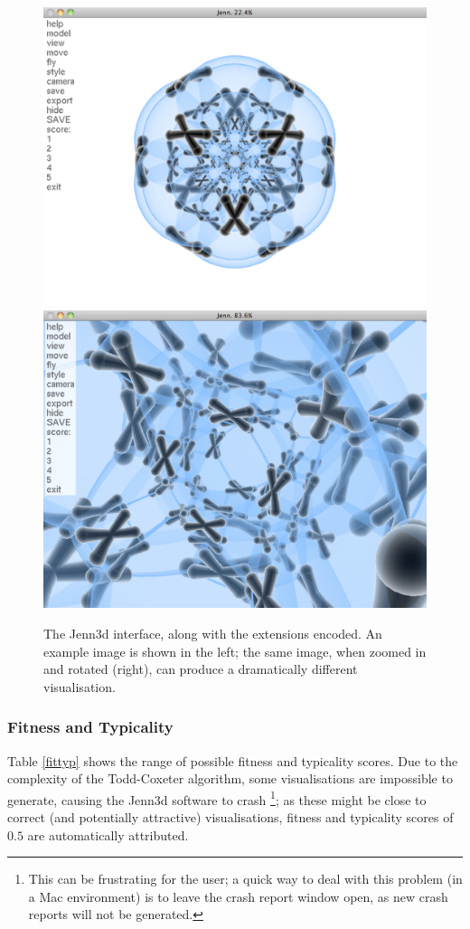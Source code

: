 \documentclass{article}
\begin{document}
\begin{figure}[ht]
	\begin{center}
		\includegraphics[width = .48\textwidth]{jennInterface1}
		\includegraphics[width = .48\textwidth]{jennInterface2}
	\end{center}
	\caption{The Jenn3d interface, along with the extensions encoded. An
	example image is shown in the left; the same image, when zoomed in
	and rotated (right), can produce a dramatically different
	visualisation.}
	\label{interface}
\end{figure}

\subsubsection{Fitness and Typicality}

Table \ref{fittyp} shows the range of possible fitness and typicality scores.
Due to the complexity of the Todd-Coxeter algorithm, some visualisations are
impossible to generate, causing the Jenn3d software to crash \footnote{This can
be frustrating for the user; a quick way to deal with this problem (in a Mac
environment) is to leave the crash report window open, as new crash reports
will not be generated.}; as these might be close to correct (and potentially
attractive) visualisations, fitness and typicality scores of $0.5$ are
automatically attributed.
\end{document}
